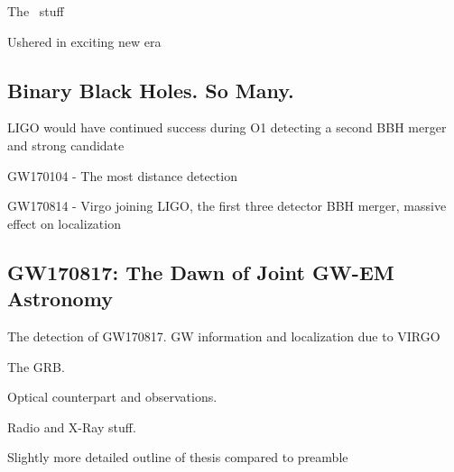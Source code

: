 The \fermi\ stuff

Ushered in exciting new era

\subsection{Binary Black Holes. So Many.}
LIGO would have continued success during O1 detecting a second BBH merger and strong candidate

GW170104 - The most distance detection

GW170814 - Virgo joining LIGO, the first three detector BBH merger, massive effect on localization 

\subsection{GW170817: The Dawn of Joint GW-EM Astronomy}
The detection of GW170817. GW information and localization due to VIRGO

The GRB. 

Optical counterpart and observations. 

Radio and X-Ray stuff.

Slightly more detailed outline of thesis compared to preamble

